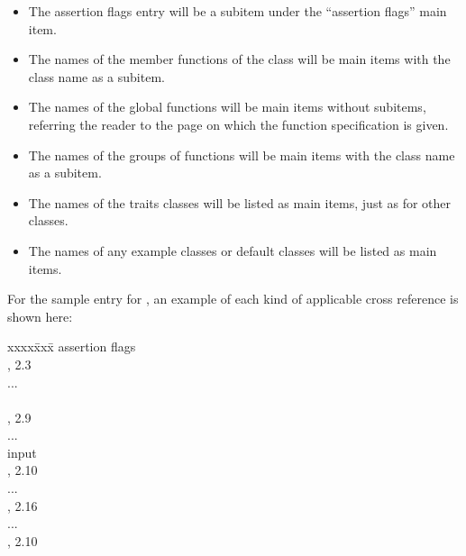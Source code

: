 \documentclass[11pt]{article}
\newenvironment{indexex}{\begin{tabbing}
xxxx\=xxx\=\kill}{\end{tabbing}}
\begin{document}
\begin{description}
         \begin{itemize}
              \item The assertion flags entry will be a subitem under the
                    ``assertion flags'' main item.
              \item The names of the member functions  of the class
                    will be main items with the class name as a subitem.
              \item The names of the global functions will be main items
                    without subitems, referring the reader to the page on 
                    which the function specification is given.
              \item The names of the groups of functions will be main items
                    with the class name as a subitem.
              \item The names of the traits classes will be listed as
                    main items, just as for other classes. 
              \item The names of any example classes or default classes
                    will be listed as main items.
         \end{itemize}
         For the sample entry for ,
         an example of each kind of applicable cross reference is shown here: 
            \begin{indexex}
            assertion flags                    \\
            \> ,  2.3 \\
            ...                                \\
                                 \\
            \> ,   2.9 \\
            ...                                \\
            input                              \\
            \> ,   2.10 \\
            ...                                \\
            , 2.16 \\
            ...                                      \\
            ,            2.10 \\
            \end{indexex}


\end{description}
\end{document}
